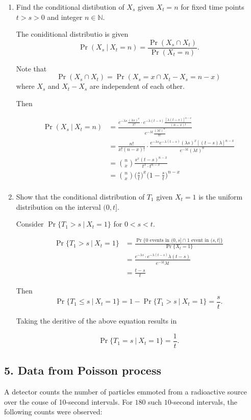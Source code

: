 \documentclass{tufte-book}
\begin{document}
\begin{enumerate}

\item Find the conditional distibution of $X_s$ given $X_t=n$ for fixed time points $t>s>0$ and integer $n \in \mathbb{N}$.

The coniditional distributio is given
\[ \Pr(X_s \ | \ X_t = n) = \frac{\Pr(X_s \cap X_t)}{\Pr(X_t=n)}. \]

Note that
\[ \Pr(X_s \cap X_t) = \Pr(X_s = x \cap X_t-X_s=n-x) \]
where $X_s$ and $X_t - X_s$ are independent of each other.

Then

\begin{align*}
\Pr(X_s \ | \ X_t = n) &= \frac{ e^{-\lambda s} \frac{(\lambda s)^x}{x!} \cdot e^{-\lambda(t-s)} \frac{[\lambda(t-s)]^{n-x}}{(n-x)!}}{e^{-\lambda t}\frac{(\lambda t)^n}{n!}}\\
&= \frac{n!}{x!(n-x)!} \cdot \frac{e^{-\lambda s} e^{-\lambda(t-s)} (\lambda s)^x [(t-s)\lambda]^{n-x}}{e^{-\lambda t} (\lambda t)^n} \\
&= \binom{n}{x} \frac{s^x (t-s)^{n-x}}{t^x \cdot t^{n-x}}\\
&= \binom{n}{x} \big(\frac{s}{t}\big)^x \big(1-\frac{s}{t}\big)^{n-x}\\
\end{align*}

\item Show that the conditional distribution of $T_1$ given $X_t=1$ is the uniform distribution on the interval $(0, t]$.

Consider $\Pr\{T_1 > s \ | \ X_t=1\}$ for $0<s<t$.

\begin{align*}
\Pr\{T_1 > s \ | \ X_t=1\} &= \frac{ \Pr\{ 0\text{ events in } (0,s] \cap 1 \text{ event in }(s,t]\}}{\Pr\{X_t=1\}}\\
&= \frac{ e^{-\lambda s} \cdot e^{-\lambda(t-s)} \lambda(t-s)}{e^{-\lambda t}\lambda t} \\
&= \frac{t-s}{t}
\end{align*}

Then
\[ \Pr\{T_1 \leq s \ | \ X_t=1\} = 1-\Pr\{T_1 > s \ | \ X_t=1\} = \frac{s}{t}. \]

Taking the deritive of the above equation results in

\[ \Pr\{T_1 = s \ | \ X_t=1\} = \frac{1}{t}. \]

\end{enumerate}

\subsection{5. Data from Poisson process}
A detector counts the number of particles emmoted from a radioactive source over the couse of 10-second intervals.  For $180$ such $10$-second intervals, the following counts were observed:
\end{document}
